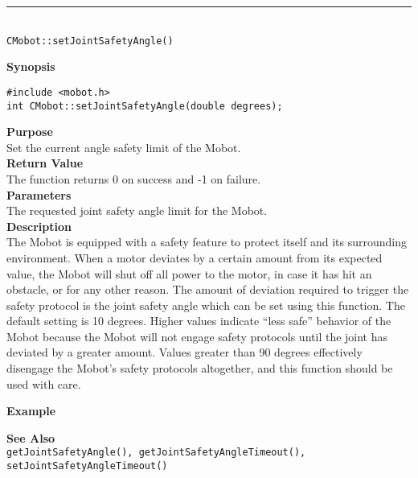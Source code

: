 \noindent
\vspace{5pt}
\rule{4.5in}{0.015in}\\
\noindent
{\LARGE \texttt{CMobot::setJointSafetyAngle()}}\\
{}

\noindent
{\bf Synopsis}
\vspace{-8pt}
\begin{verbatim}
#include <mobot.h>
int CMobot::setJointSafetyAngle(double degrees);
\end{verbatim}

\noindent
{\bf Purpose}\\
Set the current angle safety limit of the Mobot.\\

\noindent
{\bf Return Value}\\
The function returns 0 on success and -1 on failure.\\

\noindent
{\bf Parameters}\\
The requested joint safety angle limit for the Mobot.\\

\noindent
{\bf Description}\\
The Mobot is equipped with a safety feature to protect itself and its surrounding
environment. When a motor deviates by a certain amount from its expected value, 
the Mobot will shut off all power to the motor, in case it has hit an obstacle,
or for any other reason. The amount of deviation required to trigger the safety
protocol is the joint safety angle which can be set using this function.
The default setting is 10 degrees. Higher values indicate ``less safe'' behavior
of the Mobot because the Mobot will not engage safety protocols until the joint has
deviated by a greater amount. Values greater than 90 degrees effectively disengage
the Mobot's safety protocols altogether, and this function should be used with care.

\noindent
{\bf Example}\\
\noindent

\noindent
{\bf See Also}\\
\texttt{getJointSafetyAngle(), getJointSafetyAngleTimeout(), setJointSafetyAngleTimeout()}\\


